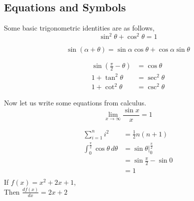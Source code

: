\subsection{Equations and Symbols}
Some basic trigonometric identities are as follows,
\begin{equation}
\sin^2\theta + \cos^2\theta = 1
\end{equation}

\begin{equation*}
\sin(\alpha + \theta) = \sin \alpha \cos \theta + \cos \alpha \sin \theta
\end{equation*}

\indent
\begin{align}
\sin(\frac{\pi}{2} -\theta) &= \cos\theta \\
1 + \tan^2 \theta &= \sec^2 \theta\\
1 + \cot^2 \theta &= \csc^2 \theta
\end{align}

Now let us write some equations from calculus.
\begin{equation*}
\lim_{x \to \infty} \frac{\sin x}{x} = 1
\end{equation*}

\begin{align*}
\sum_{i=1}^n i^2 &= \frac{1}{2} n (n+1) \\
\int_0^{\frac{\pi}{2}} \cos\theta\,d\theta &= \sin\theta\Big|_0^\frac{\pi}{2} \\
  &= \sin\frac{\pi}{2} - \sin 0 \\
  &= 1 \\
\end{align*}
If  $f(x) = x^2 + 2x + 1$, \\ 
Then  $\frac{df(x)}{dx} = 2x + 2$ 

